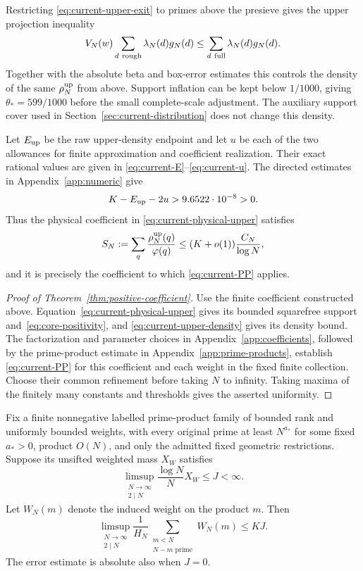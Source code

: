 Restricting \eqref{eq:current-upper-exit} to primes above the presieve
gives the upper projection inequality
\[
 V_N(w)\sum_{d\ {\rm rough}}\lambda_N(d)g_N(d)
       \le\sum_{d\ {\rm full}}\lambda_N(d)g_N(d).
\]
Together with the absolute beta and box-error estimates this controls
the density of the same $\rho_N^{\rm up}$ from above.  Support inflation can
be kept below $1/1000$, giving $\theta_*=599/1000$ before the small
complete-scale adjustment.  The auxiliary support cover used in
Section~\ref{sec:current-distribution} does not change this density.

Let $E_{\rm up}$ be the raw upper-density endpoint and let $u$ be each of the
two allowances for finite approximation and coefficient realization.
Their exact rational values are given in
\eqref{eq:current-E}--\eqref{eq:current-u}. The directed estimates in
Appendix~\ref{app:numeric} give
\begin{equation}
                     K-E_{\rm up}-2u>9.6522\cdot10^{-8}>0.
                     \label{eq:current-upper-slack}
\end{equation}
Thus the physical coefficient in \eqref{eq:current-physical-upper} satisfies
\begin{equation}
 S_N:=\sum_q\frac{\rho_N^{\rm up}(q)}{\varphi(q)}
       \le(K+o(1))\frac{C_N}{\log N},
 \label{eq:current-upper-density}
\end{equation}
and it is precisely the coefficient to which
\eqref{eq:current-PP} applies.

\begin{proof}[Proof of Theorem~\ref{thm:positive-coefficient}]
Use the finite coefficient constructed above.
Equation~\eqref{eq:current-physical-upper} gives its bounded squarefree
support and~\eqref{eq:core-positivity}, and
\eqref{eq:current-upper-density} gives its density bound.
The factorization and parameter choices in
Appendix~\ref{app:coefficients}, followed by the prime-product estimate
in Appendix~\ref{app:prime-products}, establish
\eqref{eq:current-PP} for this coefficient and each weight in the
fixed finite collection. Choose their common refinement before taking
$N$ to infinity. Taking maxima of the finitely many constants and
thresholds gives the asserted uniformity.
\end{proof}

\begin{proposition}
\label{prop:current-positive-product}
Fix a finite nonnegative labelled prime-product family of bounded
rank and uniformly bounded weights, with every original prime at least $N^{a_*}$ for some fixed
$a_*>0$, product $O(N)$, and only the admitted fixed geometric
restrictions.  Suppose its unsifted weighted mass $X_W$ satisfies
\[
 \limsup_{\substack{N\to\infty\\2\mid N}}
             \frac{\log N}{N}X_W\le J<\infty.
\]
Let $W_N(m)$ denote the induced weight on the product $m$. Then
\[
 \limsup_{\substack{N\to\infty\\2\mid N}}\frac1{H_N}
       \sum_{\substack{m<N\\N-m\text{ prime}}}W_N(m)\le KJ.
\]
The error estimate is absolute also when $J=0$.
\end{proposition}

